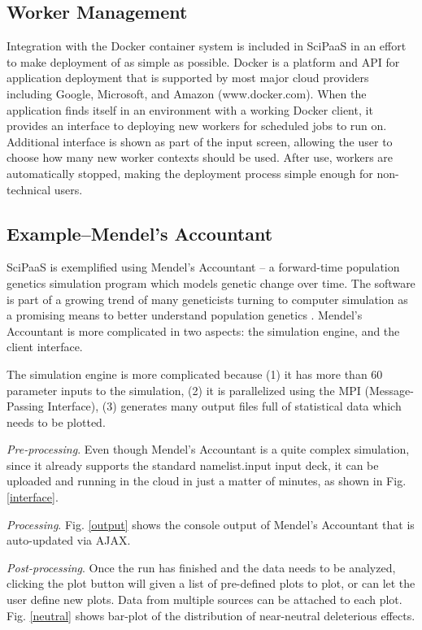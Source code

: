 \documentclass[10pt,reprint]{socc14}
\begin{document}
\subsection{Worker Management}

Integration with the Docker container system is included in SciPaaS in an effort to make deployment of as simple as possible. Docker is a platform and API for application deployment that is supported by most major cloud providers including Google, Microsoft, and Amazon (www.docker.com). When the application finds itself in an environment with a working Docker client, it provides an interface to deploying new workers for scheduled jobs to run on. Additional interface is shown as part of the input screen, allowing the user to choose how many new worker contexts should be used. After use, workers are automatically stopped, making the deployment process simple enough for non-technical users.

\subsection{Example--Mendel's Accountant}

SciPaaS is exemplified using Mendel’s Accountant – a forward-time population genetics simulation program which models genetic change over time.  The software is part of a growing trend of many geneticists turning to computer simulation as a promising means to better understand population genetics \cite{sanford12}. Mendel’s Accountant is more complicated in two aspects: the simulation engine, and the client interface.  

The simulation engine is more complicated because (1) it has more than 60 parameter inputs to the simulation, (2) it is parallelized using the MPI (Message-Passing Interface), (3) generates many output files full of statistical data which needs to be plotted. 

\textit{Pre-processing}. Even though Mendel’s Accountant is a quite complex simulation, since it already supports the standard namelist.input input deck, it can be uploaded and running in the cloud in just a matter of minutes, as shown in Fig. \ref{interface}.

\textit{Processing}.  Fig. \ref{output} shows the console output of Mendel’s Accountant that is auto-updated via AJAX.

\textit{Post-processing}.  Once the run has finished and the data needs to be analyzed, clicking the plot button will given a list of pre-defined plots to plot, or can let the user define new plots.  Data from multiple sources can be attached to each plot. Fig. \ref{neutral} shows bar-plot of the distribution of near-neutral deleterious effects. 
\end{document}
